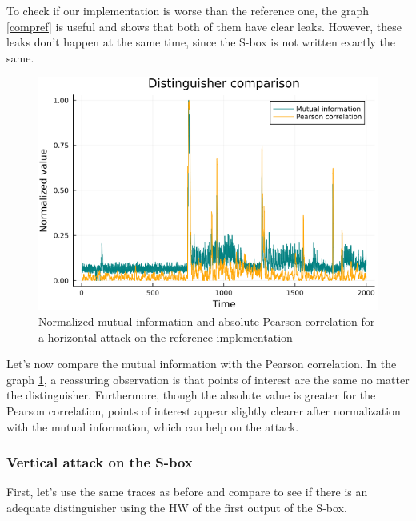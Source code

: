 \documentclass[11pt,technote]{IEEEtran}
\begin{document}
	To check if our implementation is worse than the reference one, the graph \ref{compref} is useful and shows that both of them have clear leaks. However, these leaks don't happen at the same time, since the S-box is not written exactly the same. 
	
	\begin{figure}[H]
		\centering
		\includegraphics[scale=0.4]{img_files/corr_vs_MI_hHW}
		\caption{Normalized mutual information and absolute Pearson correlation for a horizontal attack on the reference implementation}
		\label{corvsMI}
	\end{figure}
	
	Let's now compare the mutual information with the Pearson correlation. In the graph \ref{corvsMI}, a reassuring observation is that points of interest are the same no matter the distinguisher. Furthermore, though the absolute value is greater for the Pearson correlation, points of interest appear slightly clearer after normalization with the mutual information, which can help on the attack.
	
	\subsubsection{Vertical attack on the S-box}
	First, let's use the same traces as before and compare to see if there is an adequate distinguisher using the HW of the first output of the S-box.
	
\end{document}
